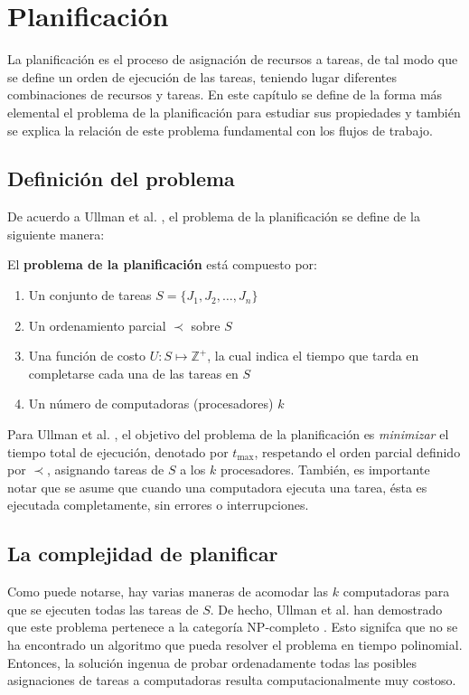 \chapter{Planificación}
La planificación
es el proceso de asignación de recursos a tareas, de tal modo que se define un orden de ejecución de las tareas, teniendo lugar diferentes combinaciones de recursos y tareas. En este capítulo se define de la forma más elemental el problema de la planificación para estudiar sus propiedades y también se explica la relación de este problema fundamental con los flujos de trabajo.


\section{Definición del problema}
\label{secc:scheduling_problem}
De acuerdo a  Ullman et al. \cite{ullman1975np}, el problema de la planificación se define de la siguiente manera: 

\begin{defn}
El \textbf{problema de la planificación} está compuesto por:
\begin{enumerate}
\item Un conjunto de tareas $S = \{ J_1, J_2, \dots, J_n \}$
\item Un ordenamiento parcial $\prec$ sobre $S$
\item Una función de costo $U: S \mapsto \mathbb{Z}^{+}$, la cual indica el tiempo que tarda en completarse cada una de las tareas en $S$
\item Un número de computadoras (procesadores) $k$
\end{enumerate}
\end{defn}

Para Ullman et al. \cite{ullman1975np}, el objetivo del problema de la planificación es \emph{minimizar} el tiempo total de ejecución, denotado por $t_\text{max}$, respetando el orden parcial definido por $\prec$, asignando tareas de $S$ a los $k$ procesadores.
También, es importante notar que se asume que cuando una computadora ejecuta una tarea, ésta es ejecutada completamente, sin errores o interrupciones.

\section{La complejidad de planificar}
Como puede notarse, hay varias maneras de acomodar las $k$ computadoras para que se ejecuten todas las tareas de $S$. De hecho, Ullman et al. han demostrado que este problema pertenece a la categoría NP-completo \cite{ullman1975np}. Esto signifca que no se ha encontrado un algoritmo que pueda resolver el problema en tiempo polinomial. Entonces, la solución ingenua de probar ordenadamente todas las posibles asignaciones de tareas a computadoras resulta computacionalmente muy costoso.

